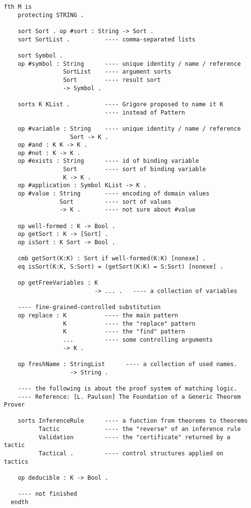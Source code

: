 \documentclass[UTF8]{article}
\theoremstyle{plain}
\theoremstyle{definition}
\theoremstyle{remark}
\begin{document}
\begin{Verbatim}[fontsize=\small]
  fth M is
    protecting STRING .
    
    sort Sort . op #sort : String -> Sort .
    sort SortList .          ---- comma-separated lists
    
    sort Symbol .
    op #symbol : String      ---- unique identity / name / reference
                 SortList    ---- argument sorts
                 Sort        ---- result sort
                 -> Symbol .
    
    sorts K KList .          ---- Grigore proposed to name it K 
                             ---- instead of Pattern
    
    op #variable : String    ---- unique identity / name / reference
                   Sort -> K .
    op #and : K K -> K .
    op #not : K -> K .
    op #exists : String      ---- id of binding variable
                 Sort        ---- sort of binding variable
                 K -> K .
    op #application : Symbol KList -> K .
    op #value : String       ---- encoding of domain values
                Sort         ---- sort of values
                -> K .       ---- not sure about #value
    
    op well-formed : K -> Bool .
    op getSort : K -> [Sort] .
    op isSort : K Sort -> Bool .
    
    cmb getSort(K:K) : Sort if well-formed(K:K) [nonexe] .
    eq isSort(K:K, S:Sort) = (getSort(K:K) = S:Sort) [nonexe] .
    
    op getFreeVariables : K 
                          -> ... .   ---- a collection of variables
    
    ---- fine-grained-controlled substitution
    op replace : K           ---- the main pattern 
                 K           ---- the "replace" pattern
                 K           ---- the "find" pattern
                 ...         ---- some controlling arguments
                 -> K .
    
    op freshName : StringList      ---- a collection of used names.
                   -> String .
    
    ---- the following is about the proof system of matching logic.
    ---- Reference: [L. Paulson] The Foundation of a Generic Theorem Prover
    
    sorts InferenceRule      ---- a function from theorems to theorems
          Tactic             ---- the "reverse" of an inference rule
          Validation         ---- the "certificate" returned by a tactic
          Tactical .         ---- control structures applied on tactics
    
    op deducible : K -> Bool .
    
    ---- not finished
  endth
\end{Verbatim}
\end{document}
